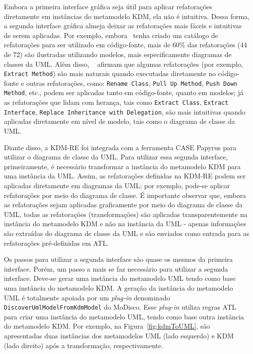 Embora a primeira interface gráfica seja útil para aplicar refatorações diretamente em instâncias do metamodelo KDM, ela não é intuitiva. Dessa forma, a segunda interface gráfica almeja deixar as refatorações mais fáceis e intuitivas de serem aplicadas. Por exemplo, embora~ tenha criado um catálogo de refatorações para ser utilizado em código-fonte, mais de 60\% das refatorações (44 de 72) são ilustradas utilizando modelos, mais especificamente diagramas de classes da UML. Além disso, ~ afirmam que algumas refatorações (por exemplo, \texttt{Extract Method}) são mais naturais quando executadas diretamente no código-fonte e outras refatorações, como: \texttt{Rename Class}, \texttt{Pull Up Method}, \texttt{Push Down Method}, etc., podem ser aplicadas tanto em código-fonte, quanto em modelos; já as refatorações que lidam com herança, tais como \texttt{Extract Class}, \texttt{Extract Interface}, \texttt{Replace Inheritance with Delegation}, são mais intuitivas quando aplicadas diretamente em nível de modelo, tais como o diagrama de classe da UML. 

Diante disso, a KDM-RE foi integrada com a ferramenta CASE Papyrus para utilizar o diagrama de classe da UML. Para utilizar essa segunda interface, primeiramente, é necessário transformar a instância do metamodelo KDM para uma instância da UML. Assim, as refatorações definidas na KDM-RE podem ser aplicadas diretamente em diagramas da UML; por exemplo, pode-se aplicar refatorações por meio do diagrama de classe. É importante observar que, embora as refatorações sejam aplicadas graficamente por meio do diagrama de classe da UML, todas as refatorações (transformações) são aplicadas transparentemente na instância do metamodelo KDM e não na instância da UML - apenas informações são extraídas do diagrama de classe da UML e são enviados como entrada para as refatorações pré-definidas em ATL. %


Os passos para utilizar a segunda interface são quase os mesmos da primeira interface. Porém, um passo a mais se faz necessário para utilizar a segunda interface. Deve-se gerar uma instância do metamodelo UML tendo como base uma instância do metamodelo KDM. A geração da instância do metamodelo UML é totalmente apoiada por um \textit{plug-in} denominado \texttt{DiscoverUmlModelFromKdmModel} do MoDisco. Esse \textit{plug-in} utiliza regras ATL para criar uma instância do metamodelo UML, tendo como base outra instância do metamodelo KDM. Por exemplo, na Figura~\ref{fig:kdmToUML}, são apresentadas duas instâncias dos metamodelos UML (lado esquerdo) e KDM (lado direito) após a transformação, respectivamente.

